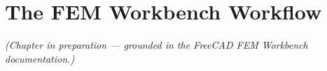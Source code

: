 \chapter{The FEM Workbench Workflow}
\label{ch:fem-workbench}


\emph{(Chapter in preparation --- grounded in the FreeCAD FEM Workbench
documentation.)}
